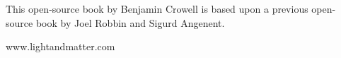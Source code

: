 \thispagestyle{empty}

\vspace{100mm}

{\sffamily


\vspace{10mm}


\vspace{10mm}

\noindent This open-source book by Benjamin Crowell is based upon
a previous open-source book by Joel Robbin and Sigurd Angenent.

\vspace{10mm}

\noindent www.lightandmatter.com

}
